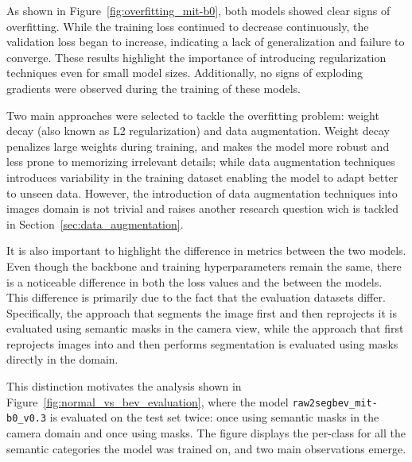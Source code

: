 As shown in Figure~\ref{fig:overfitting_mit-b0}, both models showed clear signs of overfitting. While the training loss continued to decrease continuously, the validation loss began to increase, indicating a lack of generalization and failure to converge. These results highlight the importance of introducing regularization techniques even for small model sizes. Additionally, no signs of exploding gradients were observed during the training of these models. 

Two main approaches were selected to tackle the overfitting problem: weight decay (also known as L2 regularization) and data augmentation. Weight decay penalizes large weights during training, and makes the model more robust and less prone to memorizing irrelevant details; while data augmentation techniques introduces variability in the training dataset enabling the model to adapt better to unseen data. However, the introduction of data augmentation techniques into  images domain is not trivial and raises another research question wich is tackled in Section~\ref{sec:data_augmentation}.

It is also important to highlight the difference in metrics between the two models. Even though the backbone and training hyperparameters remain the same, there is a noticeable difference in both the loss values and the  between the models. This difference is primarily due to the fact that the evaluation datasets differ. Specifically, the approach that segments the image first and then reprojects it is evaluated using semantic masks in the camera view, while the approach that first reprojects images into  and then performs segmentation is evaluated using masks directly in the  domain.

This distinction motivates the analysis shown in Figure~\ref{fig:normal_vs_bev_evaluation}, where the model \texttt{raw2segbev\_mit-b0\_v0.3} is evaluated on the test set twice: once using semantic masks in the camera domain and once using  masks. The figure displays the per-class  for all the semantic categories the model was trained on, and two main observations emerge.

